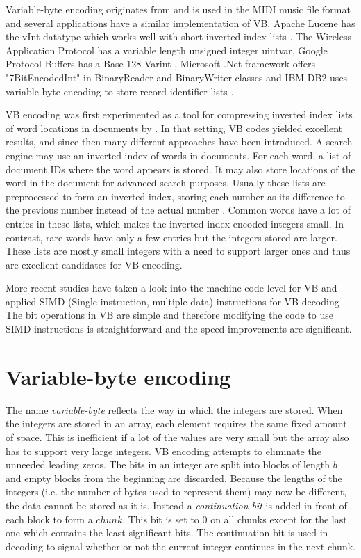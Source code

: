Variable-byte encoding originates from and is used in the MIDI music file format \citep{Mid96} and several applications have a similar implementation of VB. Apache 
Lucene has the vInt datatype \citep{ApaLV} which works well with short inverted index lists \citep{Wan09}. The Wireless Application Protocol has a variable length unsigned integer uintvar, Google Protocol Buffers has a Base 128 Varint \citep{GooPB},
 Microsoft .Net framework offers "7BitEncodedInt" in BinaryReader and BinaryWriter classes and IBM DB2 uses variable byte encoding to store record identifier lists \citep{Bha09}.

VB encoding was first experimented as a tool for compressing inverted index lists of word locations in documents by \citeauthor{Sch02}. 
In that setting, VB codes yielded excellent results, and since then many different approaches have been introduced. A search engine may use an inverted index of 
words in documents. For each word, a list of document IDs where the word appears is stored. It may also store locations of the word in the document for 
advanced search purposes. Usually these lists are preprocessed to form an inverted index, storing each number as its difference to the previous number 
instead of the actual number \citep{Man08}. Common words have a lot of entries in these lists, which makes the inverted index encoded integers small.
In contrast, rare words have only a few entries but the integers stored are larger. These lists are mostly small integers with a need to support larger ones and thus are excellent candidates for VB encoding.

More recent studies have taken a look into the machine code level for VB and applied SIMD (Single instruction, multiple data) instructions for VB decoding \citep{Lem18,Pla15}. The bit 
operations in VB are simple and therefore modifying the code to use SIMD instructions is straightforward and the speed improvements are significant. 


\section{Variable-byte encoding}
The name \textit{variable-byte} reflects the way in which the integers are stored. When the integers are stored in an array, each element requires the same fixed amount of space. This is inefficient if a lot of the values are 
very small but the array also has to support very large integers. VB encoding attempts to eliminate the unneeded leading zeros. The bits in an integer are split into blocks of length $b$ and empty blocks 
from the beginning are discarded. Because the lengths of the integers (i.e. the number of bytes used to represent them) may now be different, the data cannot be stored as it is. Instead a \textit{continuation bit} is added in front of each block to form 
a $chunk$. This bit is set to 0 on all chunks except for the last one which contains the least significant bits. The continuation bit is used in decoding to signal whether or not the current integer 
continues in the next chunk.

